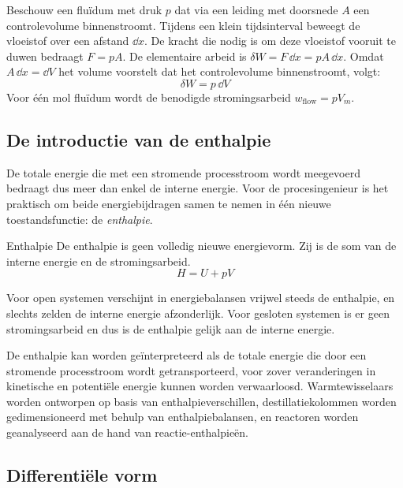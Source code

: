 Beschouw een flu\"idum met druk $p$ dat via een leiding met doorsnede $A$ een controlevolume binnenstroomt. Tijdens een klein tijdsinterval beweegt de vloeistof over een afstand $\dd {x}$. De kracht die nodig is om deze vloeistof vooruit te duwen bedraagt $F = pA$. De elementaire arbeid is $\delta W = F\,\dd{x} = pA\,\dd{x}$. Omdat $A\,\dd{x} = \dd V$ het volume voorstelt dat het controlevolume binnenstroomt, volgt:
\begin{equation*}
\delta W = p\,\dd V
\end{equation*}
Voor \'e\'en mol flu\"idum wordt de benodigde stromingsarbeid $w_{\text{flow}} = pV_m$.

\subsection{De introductie van de enthalpie}

De totale energie die met een stromende processtroom wordt meegevoerd bedraagt dus meer dan enkel de interne energie. Voor de procesingenieur is het praktisch om beide energiebijdragen samen te nemen in \'e\'en nieuwe toestandsfunctie: de \emph{enthalpie}.

\begin{definitie}{Enthalpie}
De enthalpie is geen volledig nieuwe energievorm. Zij is de som van de interne energie en de stromingsarbeid. 
\begin{equation}
H = U + pV
\end{equation}
\end{definitie}

Voor open systemen verschijnt in energiebalansen vrijwel steeds de enthalpie, en slechts zelden de interne energie afzonderlijk. Voor gesloten systemen is er geen stromingsarbeid en dus is de enthalpie gelijk aan de interne energie.

De enthalpie kan worden ge\"interpreteerd als de totale energie die door een stromende processtroom wordt getransporteerd, voor zover veranderingen in kinetische en potenti\"ele energie kunnen worden verwaarloosd. Warmtewisselaars worden ontworpen op basis van enthalpieverschillen, destillatiekolommen worden gedimensioneerd met behulp van enthalpiebalansen, en reactoren worden geanalyseerd aan de hand van reactie-enthalpie\"en.

\subsection{Differenti\"ele vorm}

